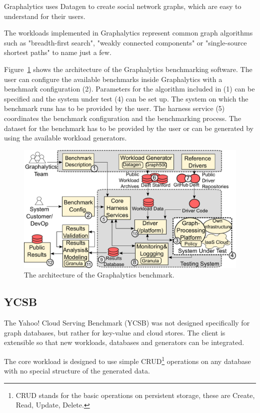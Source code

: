 Graphalytics uses Datagen to create social network graphs,
which are easy to understand for their users.~\cite[3]{Capota2015}

The workloads implemented in Graphalytics represent common graph algorithms such as "breadth-first search",
"weakly connected components" or "single-source shortest paths" to name just a few.~\cite[7]{Iosup}

Figure~\ref{fig:graphalyticsArchitecture} shows the architecture of the Graphalytics benchmarking software.
The user can configure the available benchmarks inside Graphalytics with a benchmark configuration (2).
Parameters for the algorithm included in (1) can be specified and the system under test (4) can be set up.
The system on which the benchmark runs has to be provided by the user.
The harness service (5) coordinates the benchmark configuration and the benchmarking process.
The dataset for the benchmark has to be provided by the user or can be generated by using the available workload generators.~\cite[11]{Iosup}

\begin{figure}[h!]
  \centering
  \includegraphics[width=.75\textwidth]{images/benchmarks/GraphalyticsArchitecture}
  \caption{The architecture of the Graphalytics benchmark.~\cite[11]{Iosup}}
  \label{fig:graphalyticsArchitecture}
\end{figure}

\subsection{YCSB}
\label{ch:background:se:ycsb}
The Yahoo! Cloud Serving Benchmark (YCSB) was not designed specifically for graph databases,
but rather for key-value and cloud stores.
The client is extensible so that new workloads,
databases and generators can be integrated.~\cite{Yahoo!2010}

The core workload is designed to use simple CRUD\footnote{CRUD stands for the basic operations on persistent storage, these are Create, Read, Update, Delete.} operations on any database with no special structure of the generated data.

